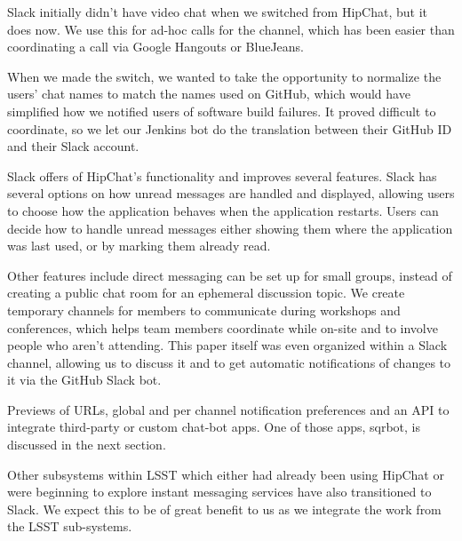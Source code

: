 Slack initially didn't have video chat when we switched from HipChat, but
it does now.  We use this for ad-hoc calls for the channel, which has been
easier than coordinating a call via Google Hangouts or BlueJeans.

When we made the switch, we wanted to take the opportunity to normalize the
users' chat names to match the names used on GitHub, which would have 
simplified how we notified users of software build failures.  It proved
difficult to coordinate, so we let our Jenkins bot do the translation between
their GitHub ID and their Slack account.

Slack offers of HipChat's functionality and improves several features. Slack 
has several options on how unread messages are handled and displayed, allowing
users to choose how the application behaves when the application restarts. 
Users can decide how to handle unread messages either showing them where the
application was last used, or by marking them already read.

Other features include direct messaging can be set up for small groups,
instead of creating a public chat room for an ephemeral discussion topic.
We create temporary channels for members to communicate during workshops and 
conferences, which helps team members coordinate while on-site and to involve
people who aren't attending.  This paper itself was even organized
within a Slack channel, allowing us to discuss it and to get automatic
notifications of changes to it via the GitHub Slack bot.

Previews of URLs, global and per channel notification preferences and an 
API to integrate third-party or custom chat-bot apps. One of those apps, 
sqrbot, is discussed in the next section.  

Other subsystems within LSST which either had already been using HipChat or
were beginning to explore instant messaging services have also transitioned to 
Slack. We expect this to be of great benefit to us as we integrate the work 
from the LSST sub-systems.


